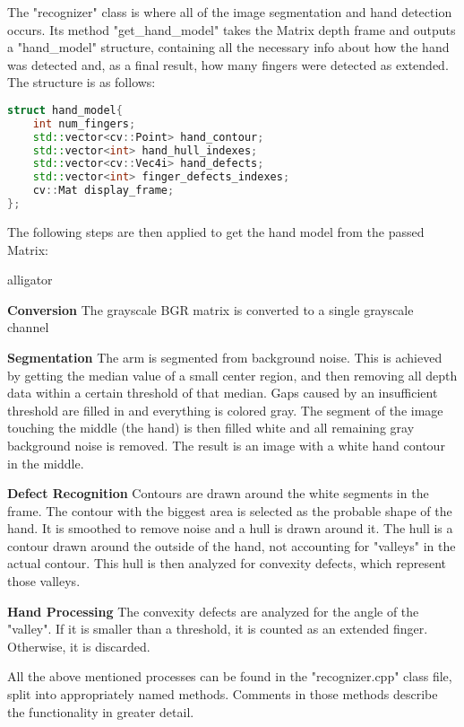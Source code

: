 \documentclass[BSA,Bachelor,english]{twbook}%
\begin{document}
The "recognizer" class is where all of the image segmentation and hand detection occurs. Its method "get\_hand\_model" takes the Matrix depth frame and outputs a "hand\_model" structure, containing all the necessary info about how the hand was detected and, as a final result, how many fingers were detected as extended. The structure is as follows:

\begin{lstlisting}[language=C++,name={Hand Model Structure},label={rs:hand_model:1}]
struct hand_model{
	int num_fingers;
	std::vector<cv::Point> hand_contour;
	std::vector<int> hand_hull_indexes;
	std::vector<cv::Vec4i> hand_defects;
	std::vector<int> finger_defects_indexes;
	cv::Mat display_frame;
};
\end{lstlisting}

\newpage
The following steps are then applied to get the hand model from the passed Matrix:

\begin{labeling}{alligator}
	\item [\textbf{Conversion}] The grayscale BGR matrix is converted to a single grayscale channel
	\item [\textbf{Segmentation}] The arm is segmented from background noise. This is achieved by getting the median value of a small center region, and then removing all depth data within a certain threshold of that median. Gaps caused by an insufficient threshold are filled in and everything is colored gray. The segment of the image touching the middle (the hand) is then filled white and all remaining gray background noise is removed. The result is an image with a white hand contour in the middle.
	\item [\textbf{Defect Recognition}] Contours are drawn around the white segments in the frame. The contour with the biggest area is selected as the probable shape of the hand. It is smoothed to remove noise and a hull is drawn around it. The hull is a contour drawn around the outside of the hand, not accounting for "valleys" in the actual contour. This hull is then analyzed for convexity defects, which represent those valleys.
	\item [\textbf{Hand Processing}] The convexity defects are analyzed for the angle of the "valley". If it is smaller than a threshold, it is counted as an extended finger. Otherwise, it is discarded.
\end{labeling}

All the above mentioned processes can be found in the "recognizer.cpp" class file, split into appropriately named methods. Comments in those methods describe the functionality in greater detail.
\end{document}
